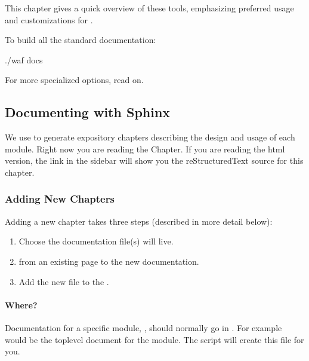 \documentclass[letterpaper,10pt,english]{sphinxmanual}
\renewcommand{\sphinxcode}[1]{\texttt{\small{#1}}}
\begin{document}
This chapter gives a quick overview of these
tools, emphasizing preferred usage and customizations for .

To build all the standard documentation:

\begin{sphinxVerbatim}[commandchars=\\\{\}]
\PYGZdl{} ./waf docs
\end{sphinxVerbatim}

For more specialized options, read on.


\subsection{Documenting with Sphinx}
\label{\detokenize{documentation:documenting-with-sphinx}}
We use  to generate expository chapters describing
the design and usage of each module.  Right now you are reading the
{\hyperref[\detokenize{documentation::doc}]{}} Chapter.
If you are reading the html version, the
 link in the sidebar
will show you the reStructuredText source for this chapter.


\subsubsection{Adding New Chapters}
\label{\detokenize{documentation:adding-new-chapters}}
Adding a new chapter takes three steps (described in more detail below):
\begin{enumerate}
%
\item {} 
Choose {\hyperref[\detokenize{documentation:where}]{}} the documentation file(s) will live.

\item {} 
{\hyperref[\detokenize{documentation:link}]{}} from an existing page to the new documentation.

\item {} 
Add the new file to the {\hyperref[\detokenize{documentation:makefile}]{}}.

\end{enumerate}


\paragraph{Where?}
\label{\detokenize{documentation:where}}
Documentation for a specific module, \sphinxcode{}, should normally go in
\sphinxcode{}.  For example \sphinxcode{} would be the
top\sphinxhyphen{}level document for the module.  The \sphinxcode{} script
will create this file for you.
\end{document}
